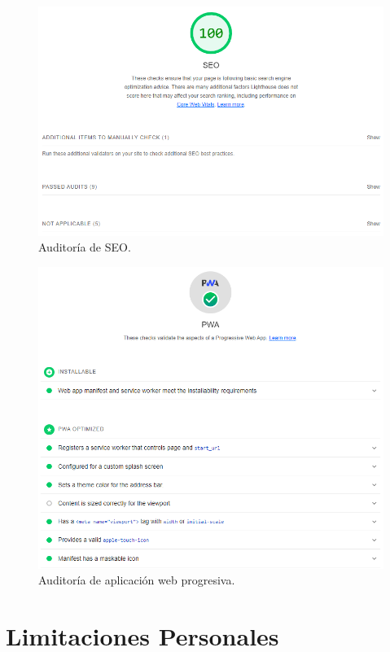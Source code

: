 \documentclass[12pt,twoside,titlepage]{report}
\begin{document}
\begin{figure}[H]
    \centering
    \includegraphics[scale=0.6]{Lighthouse/SEO}
    \caption{Auditoría de SEO.}
    \label{fig:Lighthouse_seo}
\end{figure}

\begin{figure}[H]
    \centering
    \includegraphics[scale=0.6]{Lighthouse/PWA}
    \caption{Auditoría de aplicación web progresiva.}
    \label{fig:Lighthouse_PWA}
\end{figure}

\chapter{Limitaciones Personales}
\end{document}
